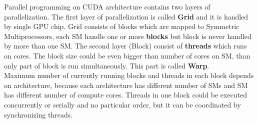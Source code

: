 Parallel programming on CUDA architecture contains two layers of parallelization. The first layer of parallelization is called \textbf{Grid} and it is handled by single GPU chip. Grid consists of blocks which are mapped to Symmetric Multiprocessors, each SM handle one or more \textbf{blocks} but block is never handled by more than one SM. The second layer (Block) consist of \textbf{threads} which runs on cores. The block size could be even bigger than number of cores on SM, than only part of block is run simultaneously. This part is called \textbf{Warp}.\\ Maximum number of currently running blocks and threads in each block depends on architecture, because each architecture has different number of SMs and SM has different number of compute cores. Threads in one block could be executed concurrently or serially and no particular order, but it can be coordinated by synchronizing threads.\\

